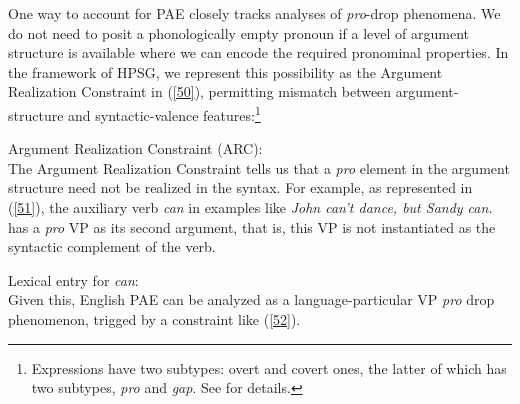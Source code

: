 \documentclass[output=paper
                ,modfonts
                ,nonflat
	        ,collection
	        ,collectionchapter
	        ,collectiontoclongg
 	        ,biblatex
                ,babelshorthands
                ,newtxmath
                ,draftmode
                ,colorlinks, citecolor=brown
]{./langsci/langscibook}
\begin{document}
{%
%

One way to account for PAE closely tracks analyses of {\it pro}-drop phenomena. We do not need to posit a phonologically empty pronoun if a level of argument structure is
available where we can encode the required pronominal properties\citep[see][]{Bresnan1982a, Kim2015, Ginzburg2018}. In the framework of HPSG, we represent this possibility as the Argument Realization Constraint in (\ref{50}), permitting mismatch between argument-structure and syntactic-valence features:\footnote{Expressions have two subtypes: overt and covert ones, the latter of which has two subtypes, \textit{pro} and \textit{gap}. See \citet{Sag2012a} for details.}

\ea
\label{50}
Argument Realization Constraint (ARC):\\
 \impl
{}
\z
The Argument Realization Constraint tells us that a \textit{pro} element
in the argument structure need not be realized in the syntax.
 For
example, as represented in (\ref{51}), the auxiliary
verb \textit{can} in examples like \textit{John can't dance, but Sandy can.}
has a \textit{pro} VP as its second argument, that is, this VP is not instantiated as the syntactic
complement of the verb. %

\ea
\label{51}
Lexical entry for \textit{can}:\\
\z
%
%
Given this, English PAE can be analyzed as a language-particular VP \textit{pro} drop phenomenon, trigged
by a constraint like (\ref{52}).

}
\end{document}
